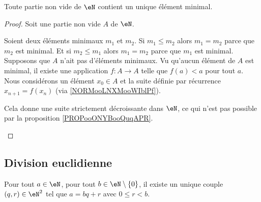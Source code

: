 \begin{proposition}	\label{PROPooZLEXooGyjNRk}
	Toute partie non vide de \( \eN\) contient un unique élément minimal.
\end{proposition}

\begin{proof}
	Soit une partie non vide \( A\) de \( \eN\).
	\begin{subproof}
		\spitem[Unicité]
		Soient deux éléments minimaux \( m_1\) et \( m_2\). Si \( m_1\leq m_2\) alors \( m_1=m_2\) parce que \( m_2\) est minimal. Et si \( m_2\leq m_1\) alors \( m_1=m_2\) parce que \( m_1\) est minimal.
		\spitem[Existence]
		Supposons que \( A\) n'ait pas d'éléments minimaux. Vu qu'aucun élément de \( A\) est minimal, il existe une application \(f \colon A\to A  \) telle que \( f(a)<a\) pour tout \( a\). Nous considérons un élément \( x_0\in A\) et la suite définie par récurrence \( x_{n+1}=f(x_n)\) (via \ref{NORMooLNXMooWIblPf}).

		Cela donne une suite strictement décroissante dans \( \eN\), ce qui n'est pas possible par la proposition \ref{PROPooONYBooQuqAPR}.
	\end{subproof}
\end{proof}





\subsection{Division euclidienne}


\begin{theorem}       \label{THOooKDJVooRIJRHP}
	Pour tout \( a\in \eN\), pour tout \( b\in \eN\setminus\{ 0 \}\), il existe un unique couple \( (q,r)\in \eN^2\) tel que \( a=bq+r\) avec \( 0\leq r<b\).
\end{theorem}


